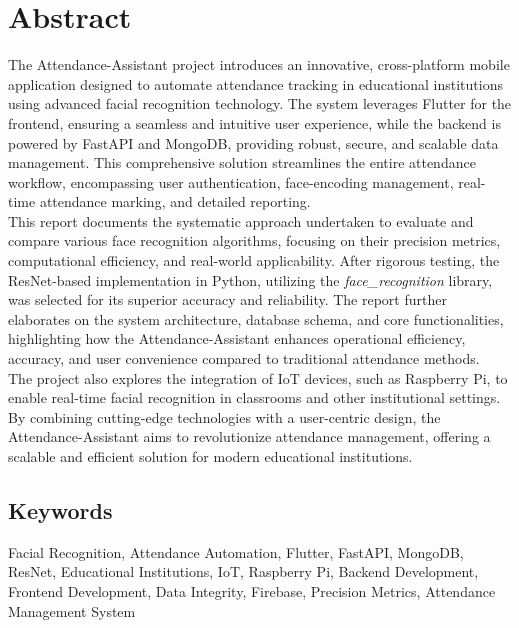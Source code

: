\documentclass[openany]{report}
\begin{document}
\thispagestyle{empty}
\clearpage

\chapter*{Abstract}
The Attendance-Assistant project introduces an innovative, cross-platform mobile application designed to automate attendance tracking in educational institutions using advanced facial recognition technology. The system leverages Flutter for the frontend, ensuring a seamless and intuitive user experience, while the backend is powered by FastAPI and MongoDB, providing robust, secure, and scalable data management. This comprehensive solution streamlines the entire attendance workflow, encompassing user authentication, face-encoding management, real-time attendance marking, and detailed reporting.\\ 


This report documents the systematic approach undertaken to evaluate and compare various face recognition algorithms, focusing on their precision metrics, computational efficiency, and real-world applicability. After rigorous testing, the ResNet-based implementation in Python, utilizing the \textit{face\_recognition} library, was selected for its superior accuracy and reliability. The report further elaborates on the system architecture, database schema, and core functionalities, highlighting how the Attendance-Assistant enhances operational efficiency, accuracy, and user convenience compared to traditional attendance methods.\\


The project also explores the integration of IoT devices, such as Raspberry Pi, to enable real-time facial recognition in classrooms and other institutional settings. By combining cutting-edge technologies with a user-centric design, the Attendance-Assistant aims to revolutionize attendance management, offering a scalable and efficient solution for modern educational institutions.

\section*{Keywords}
Facial Recognition, Attendance Automation, Flutter, FastAPI, MongoDB, ResNet, Educational Institutions, IoT, Raspberry Pi, Backend Development, Frontend Development, Data Integrity, Firebase, Precision Metrics, Attendance Management System

\listoffigures
\clearpage
\listoftables
\clearpage
\end{document}

